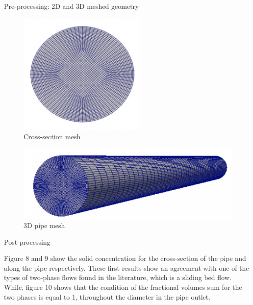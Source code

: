 \documentclass[review,3p,times,12pt]{elsarticle}
\begin{document}
\begin{itemize}
\bf{\item Pre-processing: 2D and 3D meshed geometry}
\end{itemize}
\vspace{0.5cm}
\begin{minipage}{0.45\textwidth}
\begin{figure}[H]
\begin{center}
%
\includegraphics[trim=0cm 0cm 0cm 0cm,clip,scale=0.6]{figs/1.png}
\caption{ Cross-section mesh}
\label{fig:gauss}
\end{center}
\end{figure} 
\end{minipage}\hfill
\begin{minipage}{0.45\textwidth}
\begin{figure}[H]
\begin{center}
%
\includegraphics[trim=0cm 0cm 0cm 0cm,clip,scale=0.6]{figs/2.png}
\caption{ 3D pipe mesh}
\label{fig:gauss}
\end{center}
\end{figure} 
\end{minipage}\vspace{0.5cm}
\begin{itemize}
\bf{\item Post-processing}
\end{itemize}
Figure 8 and 9 show the solid concentration for the cross-section of the pipe and along the pipe respectively. These first results show an agreement with one of the types of two-phase flows found in the literature, which is a sliding bed flow. While, figure 10 shows that the condition of the fractional volumes sum for the two phases is equal to 1, throughout the diameter in the  pipe outlet.\\
\end{document}
